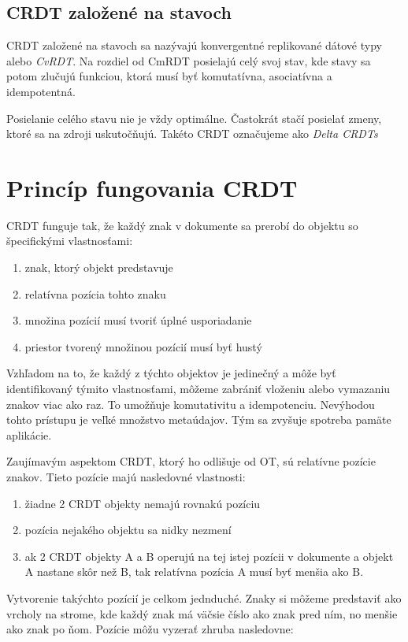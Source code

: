 \subsection{CRDT založené na stavoch}
CRDT založené na stavoch sa nazývajú konvergentné replikované dátové typy alebo \textit{CvRDT}.
Na rozdiel od CmRDT posielajú celý svoj stav, kde stavy sa potom zlučujú funkciou,
ktorá musí byť komutatívna, asociatívna a idempotentná.

Posielanie celého stavu nie je vždy optimálne. Častokrát stačí posielať zmeny, ktoré sa na zdroji
uskutočňujú. Takéto CRDT označujeme ako \textit{Delta CRDTs}

\section{Princíp fungovania CRDT}
CRDT funguje tak, že každý znak v dokumente sa prerobí do objektu so špecifickými vlastnosťami:
\begin{enumerate}
  \label{def_pozicie}
  \item znak, ktorý objekt predstavuje
  \item relatívna pozícia tohto znaku
  \item množina pozícií musí tvoriť úplné usporiadanie
  \item priestor tvorený množinou pozícií musí byť hustý
\end{enumerate}
Vzhľadom na to, že každý z týchto objektov je jedinečný a môže byť identifikovaný
týmito vlastnosťami, môžeme zabrániť vloženiu alebo vymazaniu znakov viac ako raz.
To umožňuje komutativitu a idempotenciu. Nevýhodou tohto prístupu je veľké množstvo metaúdajov.
Tým sa zvyšuje spotreba pamäte aplikácie.

Zaujímavým aspektom CRDT, ktorý ho odlišuje od OT, sú relatívne pozície znakov. Tieto pozície majú
nasledovné vlastnosti:
\begin{enumerate}
  \item žiadne 2 CRDT objekty nemajú rovnakú pozíciu
  \item pozícia nejakého objektu sa nidky nezmení
  \item ak 2 CRDT objekty A a B operujú na tej istej pozícii v dokumente a objekt A
  nastane skôr než B, tak relatívna pozícia A musí byť menšia ako B.
\end{enumerate}
Vytvorenie takýchto pozícií je celkom jednduché.
Znaky si môžeme predstaviť ako vrcholy na strome, kde každý znak má väčsie číslo ako znak pred
ním, no menšie ako znak po ňom. Pozície môžu vyzerať zhruba nasledovne:

